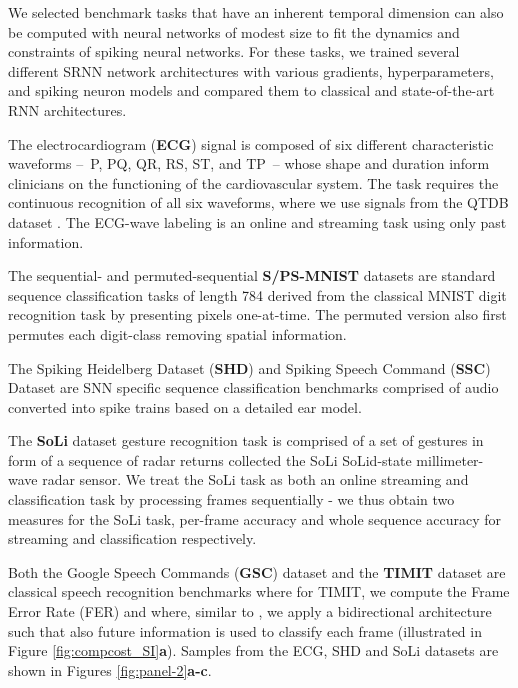 \documentclass[fleqn,10pt]{wlscirep}
\begin{document}
We selected benchmark tasks that have an inherent temporal dimension can also be computed with neural networks of modest size to fit the dynamics and constraints of spiking neural networks. For these tasks, we trained several different SRNN network architectures with various gradients, hyperparameters, and spiking neuron models and compared them to classical and state-of-the-art RNN architectures.

The electrocardiogram ({\bf ECG}) \cite{laguna1997database} signal is composed of six different characteristic waveforms --~P, PQ, QR, RS, ST, and TP~-- whose shape and duration inform clinicians on the functioning of the cardiovascular system. The task requires the continuous recognition of all six waveforms, where we use signals from the QTDB dataset \cite{laguna1997database}. The ECG-wave labeling is an online and streaming task using only past information. 




The sequential- and permuted-sequential {\bf S/PS-MNIST} datasets are standard sequence classification tasks of length 784  derived from the classical MNIST digit recognition task by presenting pixels one-at-time. The permuted version also first permutes each digit-class removing spatial information. 

The Spiking Heidelberg Dataset ({\bf SHD}) and Spiking Speech Command ({\bf SSC}) Dataset \cite{cramer2019heidelberg} are SNN specific sequence classification benchmarks comprised of audio converted into spike trains based on a detailed ear model. 


The {\bf SoLi} dataset\cite{wang2016interacting} gesture recognition task is comprised of a set of gestures in form of a sequence of radar returns collected the SoLi SoLid-state millimeter-wave radar sensor. We treat the SoLi task as both an online streaming and classification task by processing frames sequentially - we thus obtain two measures for the SoLi task, per-frame accuracy and whole sequence accuracy for streaming and classification respectively. 

Both the Google Speech Commands ({\bf GSC}) dataset\cite{warden2018speech} and the {\bf TIMIT} dataset \cite{garofolo1993timit} are classical speech recognition benchmarks where for TIMIT, we compute the Frame Error Rate (FER) and where, similar to \cite{bellec2020solution}, we apply a bidirectional architecture such that also future information is used to classify each frame (illustrated in Figure \ref{fig:compcost_SI}\textbf{a}). Samples from the ECG, SHD and SoLi datasets are shown in Figures \ref{fig:panel-2}\textbf{a-c}. 
\end{document}
